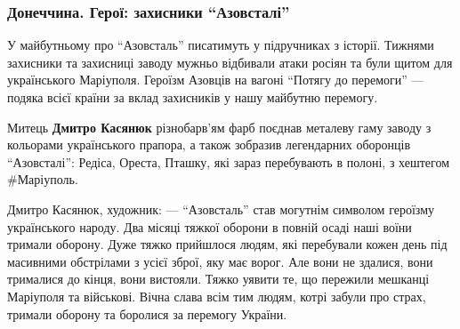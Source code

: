  
 
 
 
 

\subsubsection{Донеччина. Герої: захисники \enquote{Азовсталі}}

У майбутньому про \enquote{Азовсталь} писатимуть у підручниках з історії. Тижнями
захисники та захисниці заводу мужньо відбивали атаки росіян та були щитом для
українського Маріуполя. Героїзм Азовців на вагоні \enquote{Потягу до перемоги} — подяка
всієї країни за вклад захисників у нашу майбутню перемогу.

Митець \textbf{Дмитро Касянюк} різнобарв'ям фарб поєднав металеву гаму заводу з
кольорами українського прапора, а також зобразив легендарних оборонців
\enquote{Азовсталі}: Редіса, Ореста, Пташку, які зараз перебувають в полоні, з хештегом
\#Маріуполь.


Дмитро Касянюк, художник: — \enquote{Азовсталь} став могутнім символом героїзму
українського народу. Два місяці тяжкої оборони в повній осаді наші воїни
тримали оборону. Дуже тяжко прийшлося людям, які перебували кожен день під
масивними обстрілами з усієї зброї, яку має ворог. Але вони не здалися, вони
трималися до кінця, вони вистояли. Тяжко уявити те, що пережили мешканці
Маріуполя та військові. Вічна слава всім тим людям, котрі забули про страх,
тримали оборону та боролися за перемогу України.

